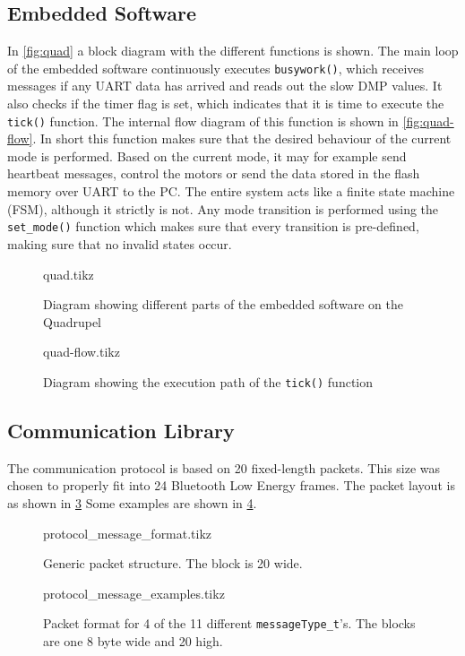 \documentclass[final]{article}
\begin{document}
\subsection{Embedded Software}
In \autoref{fig:quad} a block diagram with the different functions is shown.
The main loop of the embedded software continuously executes \texttt{busywork()}, which receives messages if any UART data has arrived and reads out the slow DMP values.
It also checks if the timer flag is set, which indicates that it is time to execute the \texttt{tick()} function.
The internal flow diagram of this function is shown in \autoref{fig:quad-flow}.
In short this function makes sure that the desired behaviour of the current mode is performed.
Based on the current mode, it may for example send heartbeat messages, control the motors or send the data stored in the flash memory over UART to the PC.
The entire system acts like a finite state machine (FSM), although it strictly is not.
Any mode transition is performed using the \texttt{set\_mode()} function which makes sure that every transition is pre-defined, making sure that no invalid states occur.

\begin{figure}[H]
\centering
    {quad.tikz}
    \caption{Diagram showing different parts of the embedded software on the Quadrupel}
    \label{fig:quad}
\end{figure}

\begin{figure}[H]
\centering
    {quad-flow.tikz}
    \caption{Diagram showing the execution path of the \texttt{tick()} function}
    \label{fig:quad-flow}
\end{figure}


\subsection{Communication Library}
The communication protocol is based on \SI{20}{\byte} fixed-length packets.
This size was chosen to properly fit into \SI{24}{\byte} Bluetooth Low Energy frames.
The packet layout is as shown in \cref{fig:packet-format}
Some examples are shown in \cref{fig:packet-examples}.
\begin{figure}[H]
\centering
    {protocol_message_format.tikz}
    \caption{Generic packet structure. The block is \SI{20}{\byte} wide.}
    \label{fig:packet-format}
\end{figure}
\begin{figure}[H]
\centering
    {protocol_message_examples.tikz}
    \caption{Packet format for 4 of the 11 different \texttt{messageType\_t}'s. The blocks are one \SI{8}{\bit} byte wide and \SI{20}{\byte} high.}
    \label{fig:packet-examples}
\end{figure}
\end{document}
